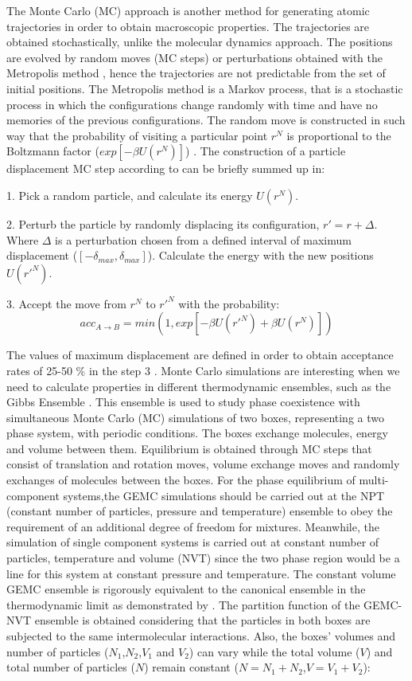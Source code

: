 The Monte Carlo (MC) approach is another method for generating atomic trajectories in order to obtain macroscopic properties. The trajectories are obtained stochastically, unlike the molecular dynamics approach. The positions are evolved by random moves (MC steps) or perturbations obtained with the Metropolis method \cite{1953JChPh..21.1087M}, hence the trajectories are not predictable from the set of initial positions. The Metropolis method is a Markov process, that is a stochastic process in which the configurations change randomly with time and have no memories of the previous configurations. The random move is constructed in such way that the probability of visiting a particular point $r^{N}$ is proportional to the Boltzmann factor ($exp[-\beta U(r^{N})]$) \cite{frenkel}. The construction of a  particle displacement MC step according to  can be briefly summed up in:

1. Pick a random particle, and calculate its energy $U(r^{N})$.

2. Perturb the particle by randomly displacing  its configuration, $r' = r +\Delta$. Where $\Delta$ is a perturbation chosen from a defined interval of maximum displacement ($[- \delta _{max},\delta _{max}]$). Calculate the energy with the new positions $U(r'^{N})$.

3. Accept the move from $r^{N}$ to $r'^{N}$ with the probability:
\begin{equation}
	acc_{A \rightarrow B} = min(1,exp[-\beta U(r'^{N}) + \beta U(r^{N}) ])
\end{equation}

The values of maximum displacement are defined in order to obtain acceptance rates of 25-50 \% in the step 3   \cite{Frenkel2013}. Monte Carlo simulations are interesting when we need to calculate properties in different thermodynamic ensembles, such as the Gibbs Ensemble \cite{papa1987}. This ensemble  is used to study phase coexistence with simultaneous Monte Carlo (MC) simulations of two boxes,  representing a two phase system, with periodic conditions. The boxes exchange molecules, energy and volume between them. Equilibrium is obtained through MC steps that consist of translation and rotation moves, volume exchange moves and randomly exchanges of molecules between the boxes. For the phase equilibrium of multi-component systems,the GEMC simulations should be carried out at the NPT (constant number of particles, pressure and temperature) ensemble to obey the requirement of an additional degree of freedom for mixtures. Meanwhile, the simulation of single component systems is carried out at constant number of particles, temperature and volume (NVT) since the two phase region would be a line for this system at constant pressure and temperature. The constant volume GEMC ensemble is rigorously equivalent to the canonical ensemble in the thermodynamic limit as demonstrated by . The partition function of the GEMC-NVT ensemble is obtained considering that the particles in both boxes are subjected to the same intermolecular interactions. Also, the boxes’ volumes and number of particles ($N_{1}$,$N_{2}$,$V_{1}$ and $V_{2}$) can vary while the total volume ($V$) and total number of particles ($N$) remain constant ($N = N_{1} + N_{2}$,$V = V_{1} + V_{2}$):

